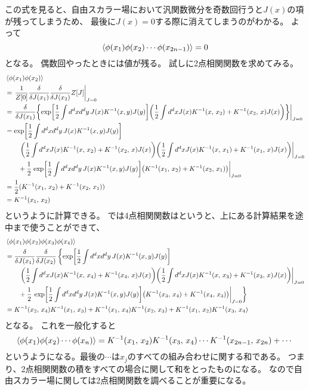 \documentclass[../../master.tex]{subfiles}
\begin{document}
この式を見ると、自由スカラー場において汎関数微分を奇数回行うと\(J(x)\)の項が残ってしまうため、
最後に\(J(x)=0\)する際に消えてしまうのがわかる。
よって
\begin{equation}
    \ev{\phi(x_1)\phi(x_2)\cdots\phi(x_{2n-1})}=0
\end{equation}
となる。
偶数回やったときには値が残る。
試しに2点相関関数を求めてみる。
\begin{align*}
    &\ev{\phi(x_1)\phi(x_2)}\\
    &=\left.\frac{1}{Z[0]}\fdv{J(x_1)}\fdv{J(x_2)}Z[J]\right|_{J=0}\\
    &=\left.\fdv{J(x_1)}\qty{\exp[\frac{1}{2}\int d^dxd^dy\,J(x)K^{-1}(x,y)J(y)]
    \qty(\frac{1}{2}\int d^dx J(x)K^{-1}(x,\,x_2)+K^{-1}(x_2,\,x)J(x))}\right|_{J=0}\\
    &=\exp[\frac{1}{2}\int d^dxd^dy\,J(x)K^{-1}(x,y)J(y)]\\
    &\left.\qquad\qty(\frac{1}{2}\int d^dx J(x)K^{-1}(x,\,x_2)+K^{-1}(x_2,\,x)J(x))
    \qty(\frac{1}{2}\int d^dx J(x)K^{-1}(x,\,x_1)+K^{-1}(x_1,\,x)J(x))
    \right|_{J=0}\\
    &\qquad+\frac{1}{2}\left.\exp[\frac{1}{2}\int d^dxd^dy\,J(x)K^{-1}(x,y)J(y)]
    \qty(K^{-1}(x_1,\,x_2)+K^{-1}(x_2,\,x_1))
    \right|_{J=0}\\
    &=\frac{1}{2}(K^{-1}(x_1,\,x_2)+K^{-1}(x_2,\,x_1))\\
    &=K^{-1}(x_1,\,x_2)
\end{align*}
というように計算できる。
では4点相関関数はというと、上にある計算結果を途中まで使うことができて、
\begin{align*}
    &\ev{\phi(x_1)\phi(x_2)\phi(x_3)\phi(x_4)}\\
    &=\fdv{J(x_1)}\fdv{J(x_2)}\left\{
        \exp[\frac{1}{2}\int d^dxd^dy\,J(x)K^{-1}(x,y)J(y)]\right.\\
    &\left.\qquad\qty(\frac{1}{2}\int d^dx J(x)K^{-1}(x,\,x_4)+K^{-1}(x_4,\,x)J(x))
    \qty(\frac{1}{2}\int d^dx J(x)K^{-1}(x,\,x_3)+K^{-1}(x_3,\,x)J(x))
    \right|_{J=0}\\
    &\qquad+\frac{1}{2}\left.\left.\exp[\frac{1}{2}\int d^dxd^dy\,J(x)K^{-1}(x,y)J(y)]
    \qty(K^{-1}(x_3,\,x_4)+K^{-1}(x_4,\,x_3))
    \right|_{J=0}\right\}\\
    &=K^{-1}(x_2,\,x_4)K^{-1}(x_1,\,x_3)+K^{-1}(x_1,\,x_4)K^{-1}(x_2,\,x_3)+K^{-1}(x_1,\,x_2)K^{-1}(x_3,\,x_4)
\end{align*}
となる。
これを一般化すると
\begin{equation}
    \ev{\phi(x_1)\phi(x_2)\cdots\phi(x_n)}
    = K^{-1}(x_1,\,x_2)K^{-1}(x_3,\,x_4)\cdots K^{-1}(x_{2n-1},\,x_{2n})
    + \cdots
\end{equation}
というようになる。最後の\(\cdots\)は\(x_j\)のすべての組み合わせに関する和である。
つまり、2点相関関数の積をすべての場合に関して和をとったものになる。
なので自由スカラー場に関しては2点相関関数を調べることが重要になる。
\end{document}
